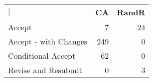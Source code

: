 \begin{tabular}{l rr}
  \toprule
  $\vert$             & \multicolumn{1}{l}{  CA} & \multicolumn{1}{l}{ RandR} \\ 
   \midrule
Accept                &   7 &    24 \\ 
  Accept - with Changes & 249 &     0 \\ 
  Conditional Accept    &  62 &     0 \\ 
  Revise and Resubmit   &   0 &     3 \\ 
   \bottomrule
\end{tabular}
